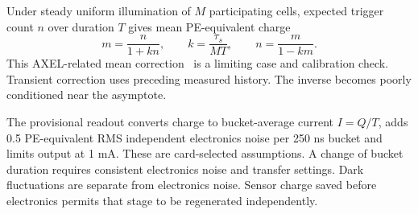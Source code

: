\documentclass[11pt,a4paper]{article}
\begin{document}
Under steady uniform illumination of $M$ participating cells, expected trigger
count $n$ over duration $T$ gives mean PE-equivalent charge
\begin{equation}
 m=\frac{n}{1+kn},\qquad k=\frac{\tau_s}{MT},\qquad
 n=\frac{m}{1-km}.
\end{equation}
This AXEL-related mean correction~\cite{Ban2020AXELPrototype} is a limiting
case and calibration check. Transient correction uses preceding measured
history. The inverse becomes poorly conditioned near the asymptote.

The provisional readout converts charge to bucket-average current $I=Q/T$,
adds 0.5 PE-equivalent RMS independent electronics noise per 250 ns bucket
and limits output at 1 mA. These are card-selected assumptions. A change of
bucket duration requires consistent electronics noise and transfer settings.
Dark fluctuations are separate from electronics noise. Sensor charge saved
before electronics permits that stage to be regenerated independently.



\end{document}
